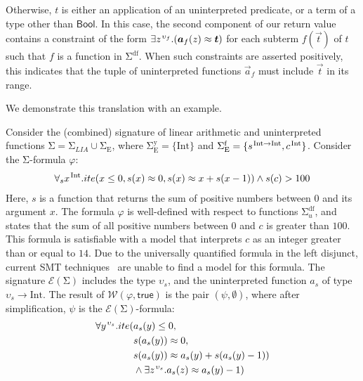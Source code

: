 \documentclass[runningheads,a4paper]{llncs}
\newcommand{\con}[1]{\mathsf{#1}}
\let\oldSigma=\Sigma
\def\Sigma{\mathrm{\oldSigma}}
\newcommand{\teq}{\approx}
\newcommand{\conv}{\mathcal{W}}
\newcommand{\ssorts}[1]{#1^\mathrm{y}}
\newcommand{\sfuns}[1]{#1^\mathrm{f}}
\newcommand{\sfundefs}[1]{#1^\mathrm{df}}
\newcommand{\sortint}{\mathrm{Int}}
\newcommand{\ptrue}{\con{true}}
\newcommand{\Bool}{\con{Bool}}
\newcommand{\farg}[1]{a_{#1}}
\newcommand{\vecfarg}[1]{\vec{a}_{#1}}
\newcommand{\fargsort}[1]{\upsilon_{#1}}
\newcommand{\Sigmalia}{\Sigma_{LIA}}
\newcommand{\extendsig}[1]{\mathcal{E}( #1 )}
\newcommand{\vthinspace}{\kern+0.083333em}
\newcommand{\typ}[1]{^{\vthinspace #1}}
\newcommand{\euf}{\ensuremath{\mathrm{E}}\xspace}
\begin{document}
Otherwise, $t$ is either an application of an uninterpreted predicate, or a term of a type other than $\Bool$.
In this case, the second component of our return value contains a constraint of the form $\exists z\typ{\fargsort{f}}. ( \vecfarg{f}( z ) \teq \vec t )$
for each subterm $f( \vec t )$ of $t$ such that $f$ is a function in $\sfundefs{\Sigma}$.
When such constraints are asserted positively, this indicates that the tuple of uninterpreted functions $\vecfarg{f}$ must include $\vec t$ in its range.

We demonstrate this translation with an example.

\begin{example}
\label{ex:translation}
Consider the (combined) signature of linear arithmetic and uninterpreted functions $\Sigma = \Sigmalia \cup \Sigma_{\euf}$,
where $\ssorts{\Sigma_{\euf}} = \{ \sortint \}$ and 
$\sfuns{\Sigma_{\euf}} = \{ s\typ{ \sortint \rightarrow \sortint }, c\typ{ \sortint } \}$.
Consider the $\Sigma$-formula $\varphi$:
\begin{eqnarray} \label{eq:ex-before}
\forall_{s} x\typ{\sortint}. ite( x \leq 0, s(x) \teq 0, s( x ) \teq x + s( x-1 ) ) \wedge s( c ) > 100
\end{eqnarray} 
Here, $s$ is a function that returns the sum of positive numbers between $0$ and its argument $x$.
The formula $\varphi$ is well-defined with respect to functions $\sfundefs{\Sigma_u}$,
and states that the sum of all positive numbers between $0$ and $c$ is greater than $100$.
This formula is satisfiable with a model that interprets $c$ as an integer greater than or equal to $14$.
Due to the universally quantified formula in the left disjunct,
current SMT techniques~\cite{GeDeM-CAV-09, ReyEtAl-1-RR-13} are unable to find a model for this formula.
The signature $\extendsig{\Sigma}$ includes the type $\fargsort{s}$,
and the uninterpreted function $\farg{s}$ of type $\fargsort{s} \rightarrow \sortint$.
The result of $\conv( \varphi, \ptrue )$ is the pair $( \psi, \emptyset )$, where after simplification, $\psi$ is the $\extendsig{\Sigma}$-formula:
\begin{eqnarray} \label{eq:ex-after}
\begin{split}
\forall y\typ{\fargsort{s}}. ite( & \farg{s}( y ) \leq 0,  \\
 & s(\farg{s}( y )) \teq 0, \\
 & s(\farg{s}( y )) \teq \farg{s}( y ) + s( \farg{s}( y )-1 ) ) \\
 & \wedge \exists z\typ{\fargsort{s}}. \farg{s}( z ) \teq \farg{s}( y )-1 )

\end{split}
\end{eqnarray}
\end{example}
\end{document}
